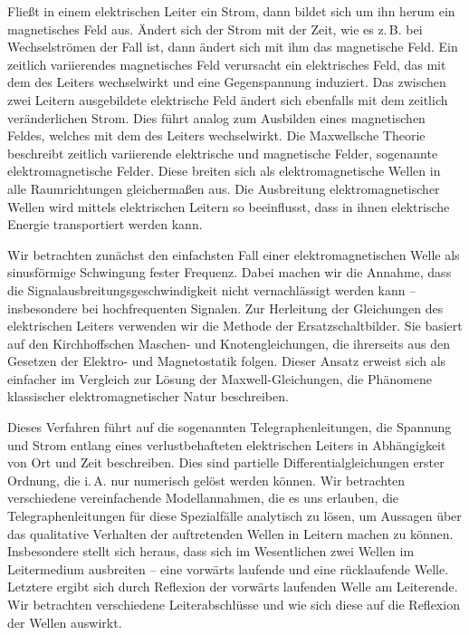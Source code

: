 \documentclass[paper=a4, parskip=half-, ngerman, fontsize=11pt]{scrreprt}
\begin{document}
Fließt in einem elektrischen Leiter ein Strom, dann bildet sich um ihn herum ein magnetisches Feld aus. Ändert sich der
Strom mit der Zeit, wie es z.\,B. bei Wechselströmen der Fall ist, dann ändert sich mit ihm das magnetische Feld. Ein
zeitlich variierendes magnetisches Feld verursacht ein elektrisches Feld, das mit dem des Leiters wechselwirkt und
eine  Gegenspannung induziert. Das zwischen zwei Leitern ausgebildete elektrische Feld ändert sich ebenfalls mit dem
zeitlich veränderlichen Strom. Dies führt analog zum Ausbilden eines magnetischen Feldes, welches mit dem des Leiters
wechselwirkt. Die Maxwellsche Theorie beschreibt zeitlich variierende elektrische und magnetische Felder, sogenannte
elektromagnetische Felder. Diese breiten sich als elektromagnetische Wellen in alle Raumrichtungen gleichermaßen aus.
Die Ausbreitung elektromagnetischer Wellen wird mittels elektrischen Leitern so beeinflusst, dass in ihnen elektrische
Energie transportiert werden kann.

Wir betrachten zunächst den einfachsten Fall einer elektromagnetischen Welle als sinusförmige Schwingung fester
Frequenz. Dabei machen wir die Annahme, dass die Signalausbreitungsgeschwindigkeit nicht vernachlässigt werden kann --
insbesondere bei hochfrequenten Signalen. Zur Herleitung der Gleichungen des elektrischen Leiters
verwenden wir die Methode der Ersatzschaltbilder. Sie basiert auf den Kirchhoffschen Maschen- und Knotengleichungen,
die ihrerseits aus den Gesetzen der Elektro- und Magnetostatik folgen. Dieser Ansatz erweist sich als einfacher
im Vergleich zur Lösung der Maxwell-Gleichungen, die Phänomene klassischer elektromagnetischer Natur beschreiben.

Dieses Verfahren führt auf die sogenannten Telegraphenleitungen, die Spannung und Strom entlang eines verlustbehafteten
elektrischen Leiters in Abhängigkeit von Ort und Zeit beschreiben. Dies sind partielle Differentialgleichungen erster
Ordnung, die i.\,A. nur numerisch gelöst werden können. Wir betrachten verschiedene vereinfachende Modellannahmen, die
es uns erlauben, die Telegraphenleitungen für diese Spezialfälle analytisch zu lösen, um Aussagen über das qualitative
Verhalten der auftretenden Wellen in Leitern machen zu können. Insbesondere stellt sich heraus, dass sich im
Wesentlichen zwei Wellen im Leitermedium ausbreiten -- eine vorwärts laufende und eine rücklaufende Welle. Letztere
ergibt sich durch Reflexion der vorwärts laufenden Welle am Leiterende. Wir betrachten verschiedene Leiterabschlüsse
und wie sich diese auf die Reflexion der Wellen auswirkt.
\end{document}
